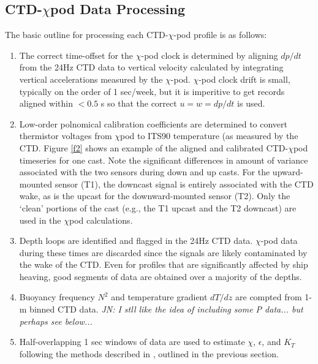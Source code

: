 \documentclass{ametsoc}
\begin{document}
\subsection{CTD-$\chi$pod Data Processing}

The basic outline for processing each CTD-$\chi$-pod profile is as follows:
\begin{enumerate}
\item The correct time-offset for the $\chi$-pod clock is determined by aligning $dp/dt$ from the 24Hz CTD data to vertical velocity calculated by integrating vertical accelerations measured by the $\chi$-pod. $\chi$-pod clock drift is small, typically on the order of 1 sec/week, but it is imperitive to get records aligned within $<0.5$ s so that the correct $u=w=dp/dt$ is used. 
\item Low-order polnomical calibration coefficients are determined to convert thermistor voltages from $\chi$pod to ITS90 temperature (as measured by the CTD.  Figure \ref{f2} shows an example of the aligned and calibrated CTD-$\chi$pod timeseries for one cast.  Note the significant differences in amount of variance associated with the two sensors during down and up casts.  For the upward-mounted sensor (T1), the downcast signal is entirely associated with the CTD wake, as is the upcast for the downward-mounted sensor (T2).  Only the `clean' portions of the cast (e.g., the T1 upcast and the T2 downcast) are used in the $\chi$pod calculations.
\item Depth loops are identified and flagged in the 24Hz CTD data. $\chi$-pod data during these times are discarded since the signals are likely contaminated by the wake of the CTD. Even for profiles that are significantly affected by ship heaving, good segments of data are obtained over a majority of the depths. \item Buoyancy frequency $N^2$ and temperature gradient $dT/dz$ are compted from 1-m binned CTD data. {\em JN: I stll like the idea of including some P data... but perhaps see below...}
\item Half-overlapping 1 sec windows of data are used to estimate $\chi$, $\epsilon$, and $K_T$ following the methods described in \cite{moumnash09}, outlined in the previous section. 
\end{enumerate}
\end{document}

